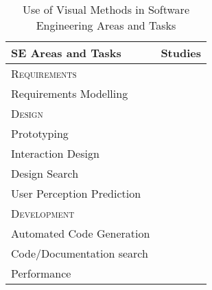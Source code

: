 \begin{table}[t]
\caption{Use of Visual Methods in Software Engineering Areas and Tasks}
\centering
\footnotesize %
\setlength{\tabcolsep}{8pt}
\renewcommand{\arraystretch}{0.9}

\begin{tabular}{l @{\hskip 1em} p{3.8cm}}
\toprule
\textbf{SE Areas and Tasks} & \textbf{Studies} \\																
\midrule
			
\textsc{Requirements}  & \\
\quad Requirements Modelling  & \cite{Li-2010-CHI, Scharf-2013-ICSE} \\ [0.5ex]

\textsc{Design}  & \\
\quad Prototyping  & \cite{Li-2010-CHI} \\ 
\quad Interaction Design & \cite{Deka-2016-UIST, Deka-2017-UIST, Bao-2017-EMSE} \\ 
\quad Design Search  & \cite{Deka-2016-UIST, Deka-2017-UIST} \\ 
\quad User Perception Prediction  & \cite{Deka-2016-UIST, Deka-2017-UIST} \\ [0.5ex]
			
\textsc{Development} & \\
\quad Automated Code Generation & \cite{Nguyen-2015-ASE, Deka-2016-UIST, Deka-2017-UIST, Reiss-2018-ASEj} \\ 
\quad Code/Documentation search & \cite{Ponzanelli-2016-ICSE, Bao-2017-EMSE, Reiss-2018-ASEj} \\ 
\quad Performance & \cite{Wan-2017-STVR} \\ [0.5ex]
			

\end{tabular}
\end{table}
